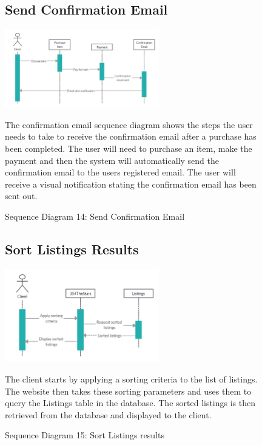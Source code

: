 \documentclass[11pt]{article}
\newcounter{use case ID}
\begin{document}
\begin{figure}[ht!]
    \subsection{Send Confirmation Email}
    \centering
    \includegraphics[width=0.6\textwidth,height=0.15\paperheight]{Diagrams/Sequence/Confirmation_Email.png}
    \caption{Sequence Diagram 14: Send Confirmation Email}
    \label{fig: Send Confirmation Email}
    \begin{justify}
        The confirmation email sequence diagram shows the steps the user needs to take to receive the confirmation email after a purchase has been completed. The user will need to purchase an item, make the payment and then the system will automatically send the confirmation email to the users registered email. The user will receive a visual notification stating the confirmation email has been sent out.
    \end{justify}
\end{figure}

\begin{figure}[ht!]
    \subsection{Sort Listings Results}
    \centering
    \includegraphics[width=0.6\textwidth,height=0.2\paperheight]{Diagrams/Sequence/Sort_Listings.jpg}
    \caption{Sequence Diagram 15: Sort Listings results}
    \label{fig: Sort Listings Results}
    \begin{justify}
        The client starts by applying a sorting criteria to the list of listings. The website then takes these sorting parameters and uses them to query the Listings table in the database. The sorted listings is then retrieved from the database and displayed to the client.
    \end{justify}
\end{figure}
\clearpage
\end{document}
